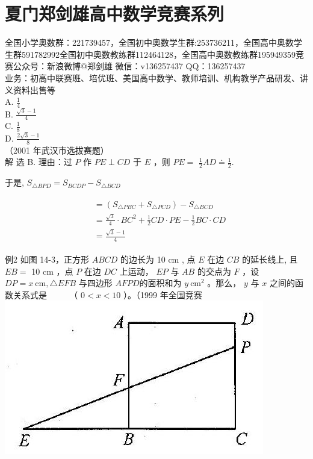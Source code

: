 \documentclass[10pt]{article}
\begin{document}
\section*{夏门郑剑雄高中数学竞赛系列}
全国小学奥数群：221739457，全国初中奥数学生群:253736211，全国高中奥数学生群591782992全国初中奥数教练群112464128，全国高中奥数教练群195949359竞赛公众号：新浪微博@郑剑雄 微信：v136257437 QQ：136257437\\
业务：初高中联赛班、培优班、美国高中数学、教师培训、机构教学产品研发、讲义资料出售等\\
A. $\frac{1}{4}$\\
B. $\frac{\sqrt{3}-1}{4}$\\
C. $\frac{1}{8}$\\
D. $\frac{2 \sqrt{3}-1}{8}$\\
（2001 年武汉市选拔赛题）\\
解 选 B. 理由：过 $P$ 作 $P E \perp C D$ 于 $E$ ，则 $P E=$ $\frac{1}{2} A D \doteq \frac{1}{2}$.

于是, $S_{\triangle B P D}=S_{B C D P}-S_{\triangle B C D}$

\begin{align*}
\begin{aligned}
& =\left(S_{\triangle P B C}+S_{\triangle P C D}\right)-S_{\triangle B C D} \\
& =\frac{\sqrt{3}}{4} \cdot B C^{2}+\frac{1}{2} C D \cdot P E-\frac{1}{2} B C \cdot C D \\
& =\frac{\sqrt{3}-1}{4}
\end{aligned}
\end{align*}

例2 如图 14-3，正方形 $A B C D$ 的边长为 10 cm , 点 $E$ 在边 $C B$ 的延长线上, 且 $E B=$ 10 cm ，点 $P$ 在边 $D C$ 上运动， $E P$ 与 $A B$ 的交点为 $F$ ，设 $D P=x \mathrm{~cm}, \triangle E F B$ 与四边形 $A F P D$的面积和为 $y \mathrm{~cm}^{2}$ 。那么， $y$ 与 $x$ 之间的函数关系式是 $\qquad$ （ $0<x<10$ ）。（1999 年全国竞赛\\
\includegraphics[max width=\textwidth, center]{2024_10_30_2c8f45efd4a519b08e1ag-128(1)}
\end{document}
